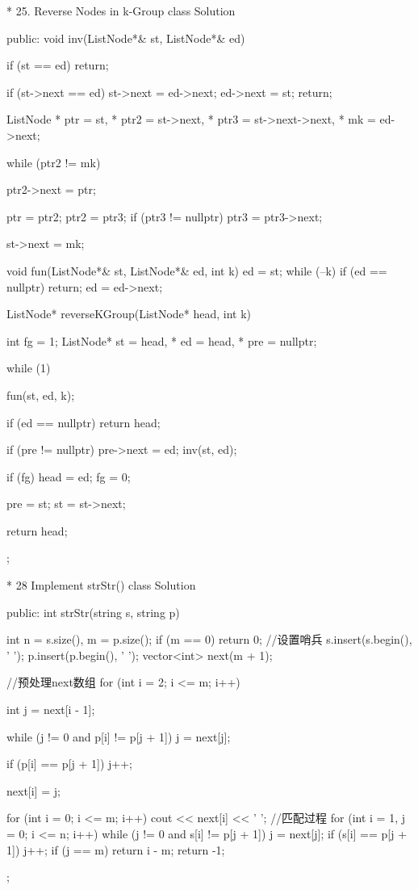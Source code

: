* 25. Reverse Nodes in k-Group
		class Solution {
		public:
			void inv(ListNode*& st, ListNode*& ed) {
				if (st == ed)
					return;

				if (st->next == ed) {
					st->next = ed->next;
					ed->next = st;
					return;
				}

				ListNode
					* ptr = st,
					* ptr2 = st->next,
					* ptr3 = st->next->next,
					* mk = ed->next;

				while (ptr2 != mk) {
					ptr2->next = ptr;

					ptr = ptr2;
					ptr2 = ptr3;
					if (ptr3 != nullptr)
						ptr3 = ptr3->next;
				}
				st->next = mk;
			}

			void fun(ListNode*& st, ListNode*& ed, int k) {
				ed = st;
				while (--k) {
					if (ed == nullptr)
						return;
					ed = ed->next;
				}
			}

			ListNode* reverseKGroup(ListNode* head, int k) {

				int fg = 1;
				ListNode* st = head, * ed = head, * pre = nullptr;

				while (1) {
					fun(st, ed, k);

					if (ed == nullptr)
						return head;

					if (pre != nullptr)
						pre->next = ed;
					inv(st, ed);

					if (fg) { head = ed; fg = 0; }
					
					pre = st;
					st = st->next;
				}

				return head;
			}
		};

* 28 Implement strStr()
		class Solution {
		public:
		int strStr(string s, string p) {
			int n = s.size(), m = p.size();
			if (m == 0) return 0;
			//设置哨兵
			s.insert(s.begin(), ' ');
			p.insert(p.begin(), ' ');
			vector<int> next(m + 1);

			//预处理next数组
			for (int i = 2; i <= m; i++) {
				int j = next[i - 1];

				while (j != 0 and p[i] != p[j + 1])
					j = next[j];

				if (p[i] == p[j + 1])
					j++;

				next[i] = j;
			}

			for (int i = 0; i <= m; i++) {
				cout << next[i] << ' ';
			}
			//匹配过程
			for (int i = 1, j = 0; i <= n; i++) {
				while (j != 0 and s[i] != p[j + 1])
					j = next[j];
				if (s[i] == p[j + 1])
					j++;
				if (j == m)
					return i - m;
			}
			return -1;
		}

		};

